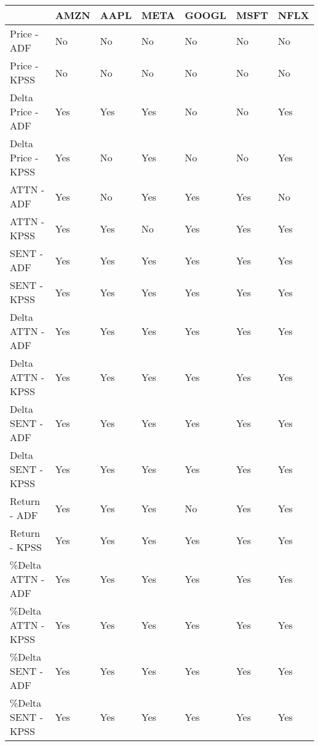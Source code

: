 \begin{tabular}{lllllll}
\toprule
{} & AMZN & AAPL & META & GOOGL & MSFT & NFLX \\
\midrule
Price - ADF        &   No &   No &   No &    No &   No &   No \\
Price - KPSS       &   No &   No &   No &    No &   No &   No \\
Delta Price - ADF  &  Yes &  Yes &  Yes &    No &   No &  Yes \\
Delta Price - KPSS &  Yes &   No &  Yes &    No &   No &  Yes \\
ATTN - ADF         &  Yes &   No &  Yes &   Yes &  Yes &   No \\
ATTN - KPSS        &  Yes &  Yes &   No &   Yes &  Yes &  Yes \\
SENT - ADF         &  Yes &  Yes &  Yes &   Yes &  Yes &  Yes \\
SENT - KPSS        &  Yes &  Yes &  Yes &   Yes &  Yes &  Yes \\
Delta ATTN - ADF   &  Yes &  Yes &  Yes &   Yes &  Yes &  Yes \\
Delta ATTN - KPSS  &  Yes &  Yes &  Yes &   Yes &  Yes &  Yes \\
Delta SENT - ADF   &  Yes &  Yes &  Yes &   Yes &  Yes &  Yes \\
Delta SENT - KPSS  &  Yes &  Yes &  Yes &   Yes &  Yes &  Yes \\
Return - ADF       &  Yes &  Yes &  Yes &    No &  Yes &  Yes \\
Return - KPSS      &  Yes &  Yes &  Yes &   Yes &  Yes &  Yes \\
\%Delta ATTN - ADF  &  Yes &  Yes &  Yes &   Yes &  Yes &  Yes \\
\%Delta ATTN - KPSS &  Yes &  Yes &  Yes &   Yes &  Yes &  Yes \\
\%Delta SENT - ADF  &  Yes &  Yes &  Yes &   Yes &  Yes &  Yes \\
\%Delta SENT - KPSS &  Yes &  Yes &  Yes &   Yes &  Yes &  Yes \\
\bottomrule
\end{tabular}
